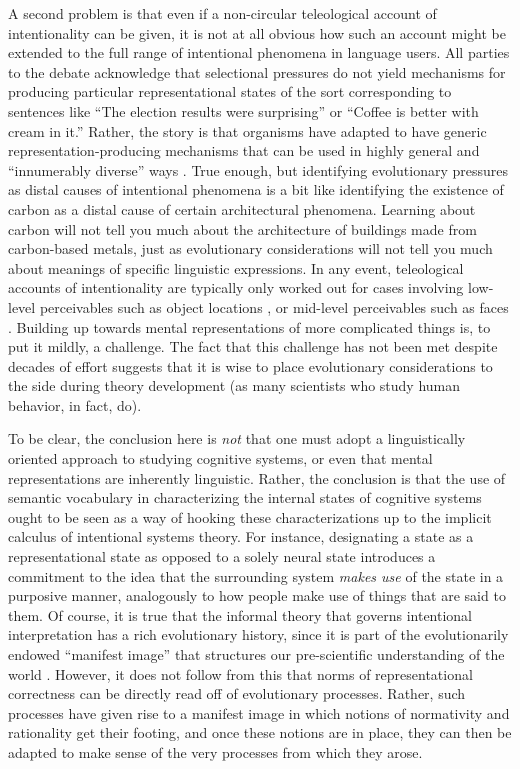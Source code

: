 A second problem is that even if a non-circular teleological account of intentionality can be given, it is not at all obvious how such an account might be extended to the full range of intentional phenomena in language users. All parties to the debate acknowledge that selectional pressures do not yield mechanisms for producing particular representational states of the sort corresponding to sentences like ``The election results were surprising'' or ``Coffee is better with cream in it.'' Rather, the story is that organisms have adapted to have generic representation-producing mechanisms that can be used in highly general and ``innumerably diverse'' ways \citep[][p. 292]{Millikan:1989}. True enough, but identifying evolutionary pressures as distal causes of intentional phenomena is a bit like identifying the existence of carbon as a distal cause of certain architectural phenomena. Learning about carbon will not tell you much about the architecture of buildings made from carbon-based metals, just as evolutionary considerations will not tell you much about meanings of specific linguistic expressions. In any event, teleological accounts of intentionality are typically only worked out for cases involving low-level perceivables such as object locations \citep{Millikan:1989}, or mid-level perceivables such as faces \citep{Dennett:1987}. Building up towards mental representations of more complicated things is, to put it mildly, a challenge. The fact that this challenge has not been met despite decades of effort suggests that it is wise to place evolutionary considerations to the side during theory development (as many scientists who study human behavior, in fact, do). 

To be clear, the conclusion here is \textit{not} that one must adopt a linguistically oriented approach to studying cognitive systems, or even that mental representations are inherently linguistic. Rather, the conclusion is that the use of semantic vocabulary in characterizing the internal states of cognitive systems ought to be seen as a way of hooking these characterizations up to the implicit calculus of intentional systems theory. For instance, designating a state as a representational state as opposed to a solely neural state introduces a commitment to the idea that the surrounding system \textit{makes use} of the state in a purposive manner, analogously to how people make use of things that are said to them. Of course, it is true that the informal theory that governs intentional interpretation has a rich evolutionary history, since it is part of the evolutionarily endowed ``manifest image'' \citep{Sellars:1963} that structures our pre-scientific understanding of the world \citep{Dennett:1987}. However, it does not follow from this that norms of representational correctness can be directly read off of evolutionary processes. Rather, such processes have given rise to a manifest image in which notions of normativity and rationality get their footing, and once these notions are in place, they can then be adapted to make sense of the very processes from which they arose.

